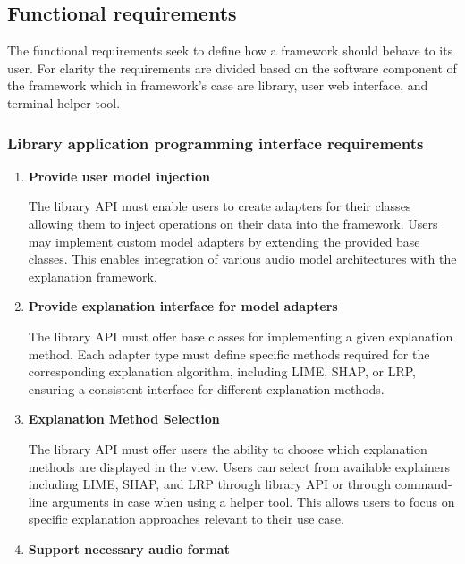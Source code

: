 \documentclass[
    bindingoffset=5mm,  %
    footnoteindent=3mm, %
    hyphenation=true    %
]{src/wut-thesis}
\begin{document}
\subsection{Functional requirements}

    The functional requirements seek to define how a framework should behave to its user.
    For clarity the requirements are divided based on the software component of the framework which
    in framework's case are library, user web interface, and terminal helper tool.

\subsubsection{Library application programming interface requirements}
    \begin{enumerate}

    \item \textbf{Provide user model injection}

        The library API must enable users to create adapters for their classes allowing them to inject operations on
    their data into the framework. Users may implement custom model adapters by extending the provided base
    classes. This enables integration of various audio model architectures with the explanation
    framework.

    \item \textbf{Provide explanation interface for model adapters}

        The library API must offer base classes for implementing a given explanation method.
    Each adapter type must define specific methods required for the corresponding explanation algorithm,
    including LIME, SHAP, or LRP, ensuring a consistent interface for different explanation methods.

    \item \textbf{Explanation Method Selection}

        The library API must offer users the ability to choose which explanation methods are displayed in the view.
    Users can select from available explainers including LIME, SHAP, and LRP through library API or through
    command-line arguments in case when using a helper tool. This allows users to focus on specific explanation
    approaches relevant to their use case.

    \item \textbf{Support necessary audio format}


\end{enumerate}
\end{document}
